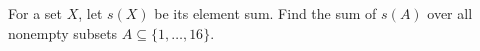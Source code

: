 For a set $X$, let $s(X)$ be its element sum. Find the sum of $s(A)$ over all nonempty subsets $A\subseteq\{1,\ldots,16\}$.
